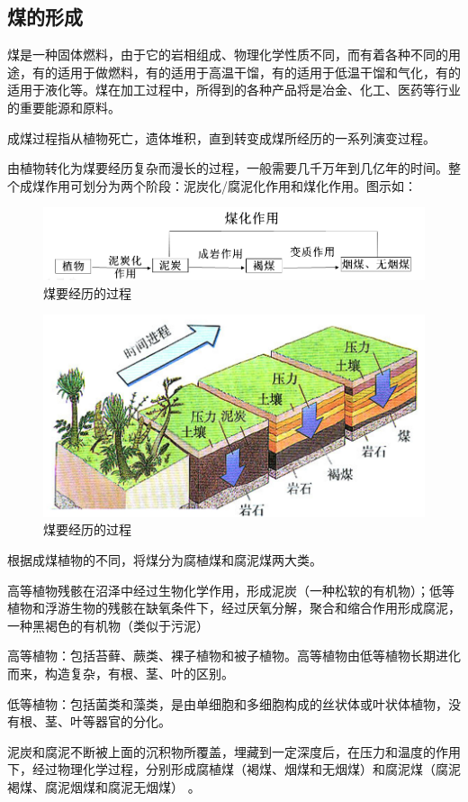 \documentclass[10pt,openany]{ctexbook}
\begin{document}
\subsection{煤的形成}
煤是一种固体燃料，由于它的岩相组成、物理化学性质不同，而有着各种不同的用途，有的适用于做燃料，有的适用于高温干馏，有的适用于低温干馏和气化，有的适用于液化等。煤在加工过程中，所得到的各种产品将是冶金、化工、医药等行业的重要能源和原料。  \par
   成煤过程指从植物死亡，遗体堆积，直到转变成煤所经历的一系列演变过程。 \par
        由植物转化为煤要经历复杂而漫长的过程，一般需要几千万年到几亿年的时间。整个成煤作用可划分为两个阶段：泥炭化/腐泥化作用和煤化作用。图示如：


\begin{figure}[h]


\includegraphics[scale=0.6]{1}
\caption{煤要经历的过程}

\end{figure}
\begin{figure}[h]
\includegraphics[scale=0.6]{2}
\caption{煤要经历的过程}
\end{figure}
根据成煤植物的不同，将煤分为腐植煤和腐泥煤两大类。\par
高等植物残骸在沼泽中经过生物化学作用，形成泥炭（一种松软的有机物）；低等植物和浮游生物的残骸在缺氧条件下，经过厌氧分解，聚合和缩合作用形成腐泥，一种黑褐色的有机物（类似于污泥） \par
高等植物：包括苔藓、蕨类、裸子植物和被子植物。高等植物由低等植物长期进化而来，构造复杂，有根、茎、叶的区别。\par
低等植物：包括菌类和藻类，是由单细胞和多细胞构成的丝状体或叶状体植物，没有根、茎、叶等器官的分化。\par
泥炭和腐泥不断被上面的沉积物所覆盖，埋藏到一定深度后，在压力和温度的作用下，经过物理化学过程，分别形成腐植煤（褐煤、烟煤和无烟煤）和腐泥煤（腐泥褐煤、腐泥烟煤和腐泥无烟煤） 。\par
\end{document}
